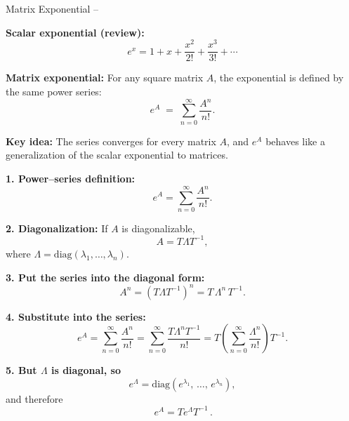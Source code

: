 \begin{frame}[t, allowframebreaks]{Matrix Exponential --}

    \textbf{Scalar exponential (review):}
    \[
        e^{x} = 1 + x + \frac{x^{2}}{2!} + \frac{x^{3}}{3!} + \cdots
    \]

    \medskip

    \textbf{Matrix exponential:}
    For any square matrix $A$, the exponential is defined by the same power series:
    \[
        e^{A} \;=\; \sum_{n=0}^{\infty} \frac{A^{n}}{n!}.
    \]

    \medskip

    \textbf{Key idea:}
    The series converges for every matrix $A$, and $e^{A}$ behaves like a
    generalization of the scalar exponential to matrices.

    \medskip


    \textbf{1. Power–series definition:}
    \[
        e^{A}
        = \sum_{n=0}^{\infty} \frac{A^{n}}{n!}.
    \]

    \medskip

    \textbf{2. Diagonalization:}
    If $A$ is diagonalizable,
    \[
        A = T \Lambda T^{-1},
    \]
    where $\Lambda = \mathrm{diag}(\lambda_1,\dots,\lambda_n)$.

    \medskip

    \textbf{3. Put the series into the diagonal form:}
    \[
        A^{n} = (T \Lambda T^{-1})^{n}
        = T\,\Lambda^{n}\,T^{-1}.
    \]

    \medskip

    \textbf{4. Substitute into the series:}
    \[
        e^{A}
        = \sum_{n=0}^{\infty} \frac{A^{n}}{n!}
        = \sum_{n=0}^{\infty}
        \frac{T \Lambda^{n} T^{-1}}{n!}
        = T\left(\sum_{n=0}^{\infty} \frac{\Lambda^{n}}{n!}\right)T^{-1}.
    \]

    \medskip

    \textbf{5. But $\Lambda$ is diagonal, so}
    \[
        e^{\Lambda}
        = \mathrm{diag}(e^{\lambda_1},\, \dots,\, e^{\lambda_n}),
    \]
    and therefore
    \[
        \boxed{\,e^{A} = T e^{\Lambda} T^{-1}\, }.
    \]

\end{frame}


